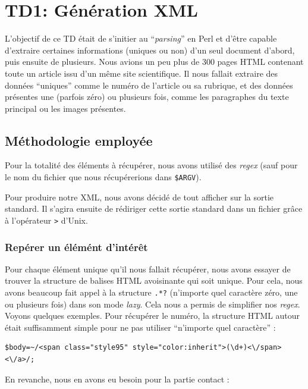 \chapter{TD1: Génération XML}

L'objectif de ce TD était de s'initier au ``\textit{parsing}'' en Perl et d'être capable d'extraire certaines informations (uniques ou non) d'un seul document d'abord, puis ensuite de plusieurs. Nous avions un peu plus de 300 pages HTML contenant toute un article issu d'un même site scientifique. Il nous fallait extraire des données ``uniques'' comme le numéro de l'article ou sa rubrique, et des données présentes une (parfois zéro) ou plusieurs fois, comme les paragraphes du texte principal ou les images présentes.

\section{Méthodologie employée}

Pour la totalité des éléments à récupérer, nous avons utilisé des \textit{regex} (sauf pour le nom du fichier que nous récupérerions dans \lstinline{$ARGV}).

Pour produire notre XML, nous avons décidé de tout afficher sur la sortie standard. Il s'agira ensuite de rédiriger cette sortie standard dans un fichier grâce à l'opérateur \lstinline{>} d'Unix.

\subsection{Repérer un élémént d'intérêt}

Pour chaque élément unique qu'il nous fallait récupérer, nous avons essayer de trouver la structure de balises HTML avoisinante qui soit unique. Pour cela, nous avons beaucoup fait appel à la structure \lstinline{.*?} (n'importe quel caractère zéro, une ou plusieurs fois) dans son mode \textit{lazy}. Cela nous a permis de simplifier nos \textit{regex}.\\
Voyons quelques exemples. Pour récupérer le numéro, la structure HTML autour était suffisamment simple pour ne pas utiliser ``n'importe quel caractère'' :

\perl
\begin{lstlisting}
$body=~/<span class="style95" style="color:inherit">(\d+)<\/span><\/a>/;
\end{lstlisting}

En revanche, nous en avons eu besoin pour la partie contact :


